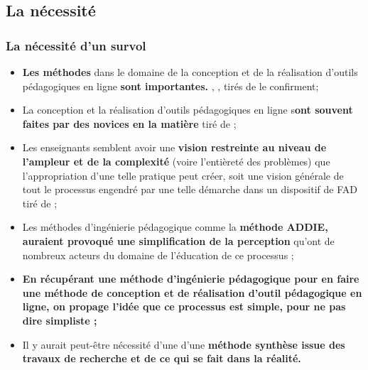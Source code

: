 \subsection{La nécessité} 
		\begin{frame}[allowframebreaks]
			\frametitle{La nécessité d’un survol}
                        
                        \begin{itemize} 
                        \item  \textbf{Les méthodes }dans le domaine de la conception et de la réalisation d’outils pédagogiques en ligne \textbf{sont importantes.} \citet[p. 842]{bohl2002a}, \citet[p. 218]{barry2003a}, \citet[p. 1]{hadjerrouit2007a} tirés de \cite{bonneau2013a} le confirment;
                        \item La conception et la réalisation d’outils pédagogiques en ligne s\textbf{ont souvent faites par des novices en la matière} \citep[p. 351]{verstegen2008a} tiré de \citet{bonneau2013a};
                        \item Les enseignants semblent avoir une \textbf{vision restreinte au niveau de l’ampleur et de la complexité} (voire l’entièreté des problèmes) que l’appropriation d’une telle pratique peut créer, soit une vision générale de tout le processus engendré par une telle démarche dans un dispositif de FAD \citep[p. 105]{roy2011a} tiré de \citet{bonneau2013a}; 
                        \item Les méthodes d’ingénierie pédagogique comme la \textbf{méthode ADDIE, auraient provoqué une simplification de la perception} qu’ont de nombreux acteurs du domaine de l’éducation de ce processus\citep[p.28]{bonneau2013a} ;
                        \item \textbf{En récupérant une méthode d’ingénierie pédagogique pour en faire une méthode de conception et de réalisation d’outil pédagogique en ligne, on propage l’idée que ce processus est simple, pour ne pas dire simpliste\citep[p.29]{bonneau2013a} ;}
                        \item Il y aurait peut-être nécessité d'une d’une \textbf{méthode synthèse issue des travaux de recherche et de ce qui se fait dans la réalité.}

                        \end{itemize}

             
                \end{frame}
                

